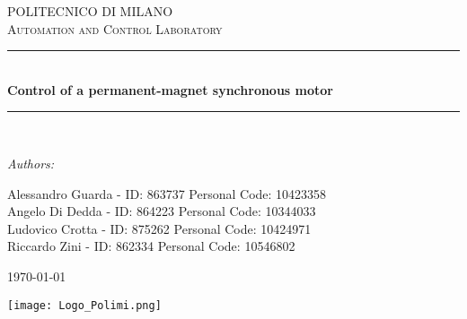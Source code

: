 \documentclass[12pt]{article}
\begin{document}
\begin{titlepage}

\newcommand{\HRule}{\rule{\linewidth}{0.5mm}} %

\center %
 

\textsc{\LARGE POLITECNICO DI MILANO}\\[1cm] %
\textsc{\Large Automation and Control Laboratory}\\[1cm] %


\HRule \\[0.4cm]
{ \huge \bfseries Control of a permanent-magnet synchronous motor}\\[0.4cm] %
\HRule \\[1.5cm]
 

\begin{flushleft}
\Large \emph{Authors:}\\[0.3cm]
\begin{large}
Alessandro Guarda - ID: 863737 Personal Code: 10423358\\
Angelo Di Dedda   - ID: 864223 Personal Code: 10344033\\
Ludovico Crotta   - ID: 875262 Personal Code: 10424971\\
Riccardo Zini     - ID: 862334 Personal Code: 10546802\\[1.5cm]\end{large}
\end{flushleft}


\begin{flushright}
{\large \today}\\[2.5cm]
\end{flushright}


\texttt{[image: Logo\_Polimi.png]}
 

\vfill %

\end{titlepage}
\end{document}
